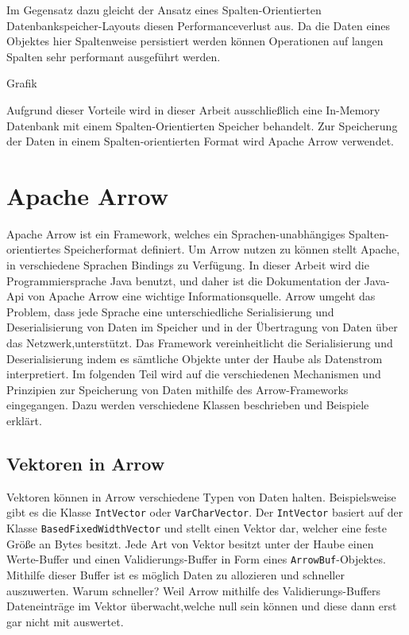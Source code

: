 Im Gegensatz dazu gleicht der Ansatz eines Spalten-Orientierten Datenbankspeicher-Layouts diesen Performanceverlust aus. 
Da die Daten eines Objektes hier Spaltenweise persistiert werden können Operationen auf langen Spalten sehr performant ausgeführt werden.

Grafik

Aufgrund dieser Vorteile wird in dieser Arbeit ausschließlich eine In-Memory Datenbank mit einem Spalten-Orientierten Speicher behandelt.
Zur Speicherung der Daten in einem Spalten-orientierten Format wird Apache Arrow verwendet.

\section{Apache Arrow}

Apache Arrow ist ein Framework, welches ein Sprachen-unabhängiges Spalten-orientiertes Speicherformat definiert. 
Um Arrow nutzen zu können stellt Apache, in verschiedene Sprachen Bindings zu Verfügung. In dieser Arbeit wird die Programmiersprache Java benutzt, und daher ist die Dokumentation der Java-Api von Apache Arrow eine wichtige Informationsquelle.\cite{Apache:Arrow:JavaApi}
Arrow umgeht das Problem, dass jede Sprache eine unterschiedliche Serialisierung und Deserialisierung von Daten im Speicher und in der Übertragung von Daten über das Netzwerk,unterstützt.
Das Framework vereinheitlicht die Serialisierung und Deserialisierung indem es sämtliche Objekte unter der Haube als Datenstrom interpretiert.
Im folgenden Teil wird auf die verschiedenen Mechanismen und Prinzipien zur Speicherung von Daten mithilfe des Arrow-Frameworks eingegangen. Dazu werden verschiedene Klassen beschrieben und Beispiele erklärt.


\subsection{Vektoren in Arrow}
Vektoren können in Arrow verschiedene Typen von Daten halten. Beispielsweise gibt es die Klasse \texttt{IntVector} oder \texttt{VarCharVector}.
Der \texttt{IntVector} basiert auf der Klasse \texttt{BasedFixedWidthVector} und stellt einen Vektor dar, welcher eine feste Größe an Bytes besitzt. Jede Art von Vektor besitzt unter der Haube einen Werte-Buffer und einen Validierungs-Buffer in Form eines \texttt{ArrowBuf}-Objektes.\\
Mithilfe dieser Buffer ist es möglich Daten zu allozieren und schneller auszuwerten. Warum schneller?
Weil Arrow mithilfe des Validierungs-Buffers Dateneinträge im Vektor überwacht,welche null sein können und diese dann erst gar nicht mit auswertet.

